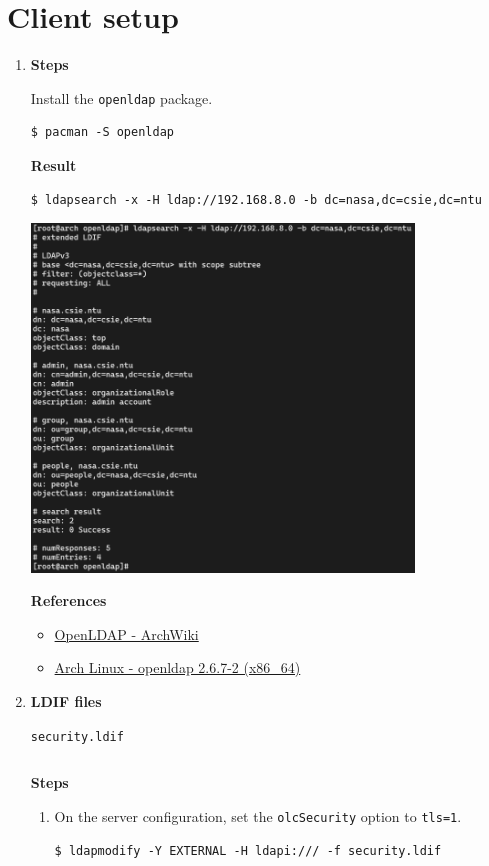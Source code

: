 \documentclass[12pt, a4paper]{article}
\begin{document}
  \section{Client setup}
  \begin{enumerate}[label=(\alph*)]
    \item \textbf{Steps}

    Install the \verb|openldap| package.
    \begin{Verbatim}[frame=single]
$ pacman -S openldap
    \end{Verbatim}

    \textbf{Result}
    \begin{Verbatim}[frame=single]
$ ldapsearch -x -H ldap://192.168.8.0 -b dc=nasa,dc=csie,dc=ntu
    \end{Verbatim}

    \includegraphics[width=0.8\textwidth]{2-a_ldapsearch.png}

    \textbf{References}
    \begin{itemize}
      \item \href{https://wiki.archlinux.org/title/openLDAP}{OpenLDAP - ArchWiki}
      \item \href{https://archlinux.org/packages/core/x86_64/openldap/}{Arch Linux - openldap 2.6.7-2 (x86\_64)}
    \end{itemize}

    \pagebreak
    \item \textbf{LDIF files}

    \verb|security.ldif|
    \inputminted{ldif}{ldif/security.ldif}

    \textbf{Steps}
    \begin{enumerate}[label=(\arabic*)]
      \item On the server configuration, set the \verb|olcSecurity| option to \verb|tls=1|.
      \begin{Verbatim}[frame=single]
$ ldapmodify -Y EXTERNAL -H ldapi:/// -f security.ldif
      \end{Verbatim}


\end{enumerate}
\end{enumerate}
\end{document}
